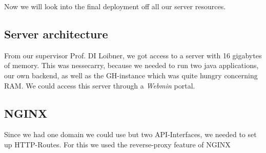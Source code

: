 \Author{\daAuthorTwo}

Now we will look into the final deployment off all our server resources.

\subsection{Server architecture}
From our supervisor Prof. DI Loibner, we got access to a server with 16 gigabytes of memory. This was nessecarry, because we needed to run two java applications, our own backend, as well as the GH-instance which was quite hungry concerning RAM. We could access this server through a \textit{Webmin} portal.

\blankLine

\subsection{NGINX}
Since we had one domain we could use but two API-Interfaces, we needed to set up HTTP-Routes. For this we used the reverse-proxy feature of NGINX
